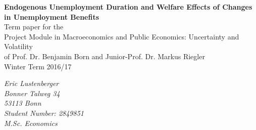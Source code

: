 \documentclass[a4paper,11pt]{article}
\begin{document}



\begin{titlepage}       %

\thispagestyle{empty}   %


\begin{center}
\vspace*{2.5cm}
{\bf  \Large Endogenous Unemployment Duration and Welfare Effects of Changes in Unemployment Benefits} \\
\vspace*{3cm} 
Term paper for the \\ Project Module in Macroeconomics and Public Economics: Uncertainty and Volatility \\
of Prof. Dr. Benjamin Born and Junior-Prof. Dr. Markus Riegler  \\
\vspace*{0.5cm} 
Winter Term 2016/17\\
\end{center}

\vfill
\begin{flushright}
   \emph{Eric Lustenberger} \\
    \emph{Bonner Talweg 34}\\
    \emph{53113 Bonn}\\
   \emph{Student Number: 2849851}\\
 \emph{M.Sc. Economics}\\

\end{flushright}



% 
% 
% 

\end{titlepage}

\newpage                %





\tableofcontents   %
% 
% 
\end{document}

